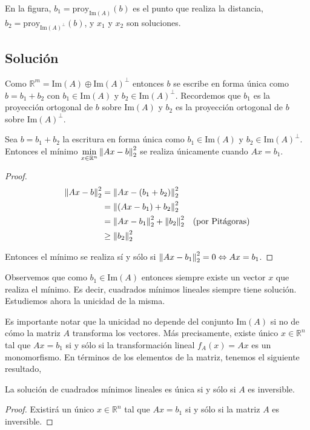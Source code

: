 En la figura, $b_1 = \text{proy}_{\text{Im}(A)}(b)$ es el punto que realiza la distancia, $b_2 = \text{proy}_{\text{Im}(A)^{\perp}}(b)$, y $x_1$ y $x_2$ son soluciones.

\subsection{Solución}

Como $\mathbb{R}^m = \text{Im}(A) \oplus \text{Im}(A)^{\perp}$ entonces $b$ se escribe en forma única como $b = b_1 + b_2$ con $b_1 \in \text{Im}(A)$ y $b_2 \in \text{Im}(A)^{\perp}$. Recordemos que $b_1$ es la proyección ortogonal de $b$ sobre $\text{Im}(A)$ y $b_2$ es la proyección ortogonal de $b$ sobre $\text{Im}(A)^{\perp}$.

\begin{propo}
Sea $b = b_1 + b_2$ la escritura en forma única como $b_1 \in \text{Im}(A)$ y $b_2 \in \text{Im}(A)^{\perp}$. Entonces el mínimo $\min\limits_{x \in  \mathbb{R}^n}\left\lVert Ax - b\right\rVert_2^2$ se realiza únicamente cuando $Ax = b_1$.

\begin{proof}
\begin{align*}
\left\lVert Ax - b\right\rVert_2^2 &= \left\lVert Ax - (b_1 + b_2)\right\rVert_2^2				&\\
				&= \left\lVert(Ax - b_1) + b_2\right\rVert_2^2				&\\
				&= \left\lVert Ax - b_1\right\rVert_2^2 + \left\lVert b_2\right\rVert_2^2		&\text{(por Pitágoras)}\\
				&\geq \left\lVert b_2\right\rVert_2^2
\end{align*}

Entonces el mínimo se realiza sí y sólo si $\left\lVert Ax - b_1\right\rVert_2^2 = 0 \Leftrightarrow Ax = b_1$.

\end{proof}
\end{propo}

Observemos que como $b_1 \in \text{Im}(A)$ entonces siempre existe un vector $x$ que realiza el mínimo. Es decir, cuadrados mínimos lineales siempre tiene solución. Estudiemos ahora la unicidad de la misma.

Es importante notar que la unicidad no depende del conjunto $\text{Im}(A)$ si no de cómo la matriz $A$ transforma los vectores. Más precisamente, existe único $x \in \mathbb{R}^n$ tal que $Ax = b_1$ si y sólo si la transformación lineal $f_A(x) = Ax$ es un monomorfismo. En términos de los elementos de la matriz, tenemos el siguiente resultado,

\begin{propo}
La solución de cuadrados mínimos lineales es única si y sólo si $A$ es inversible.

\begin{proof}
Existirá un único $x \in \mathbb{R}^n$ tal que $Ax = b_1$ si y sólo si la matriz $A$ es inversible.
\end{proof}
\end{propo}

